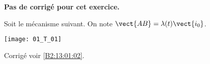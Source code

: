\normaltrue
\correctionfalse


\setcounter{question}{0}
\ifcorrection
\else
\textbf{Pas de corrigé pour cet exercice.}
\fi

\ifprof
\else
Soit le mécanisme suivant. On note $\vect{AB}=\lambda(t)\vect{i_0}$.
\begin{center}
\texttt{[image: 01\_T\_01]}
\end{center}
\fi

\ifprof
\else
\fi

\ifprof
\else
\fi


\ifprof
\else
\begin{flushright}
\footnotesize{Corrigé  voir \ref{B2:13:01:02}.}
\end{flushright}%
\fi


